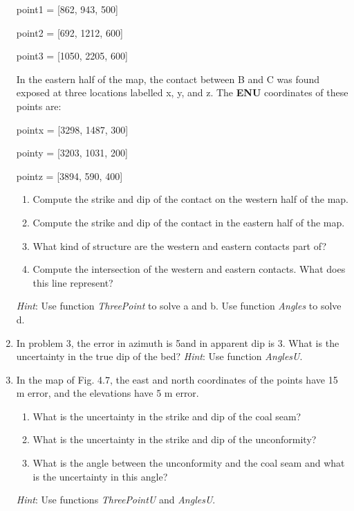 \documentclass[a4paper , 12pt]{book}
\begin{document}
\begin{enumerate}
    point1 = [862, 943, 500]
    
    point2 = [692, 1212, 600]
    
    point3 = [1050, 2205, 600]
    
    In the eastern half of the map, the contact between B and C was found exposed at three locations labelled x, y, and z. The \textbf{ENU} coordinates of these points are:
    
    pointx = [3298, 1487, 300]
    
    pointy = [3203, 1031, 200]
    
    pointz = [3894, 590, 400]
    
    \begin{enumerate}
        \item Compute the strike and dip of the contact on the western half of the map.
        \item Compute the strike and dip of the contact in the eastern half of the map.
        \item What kind of structure are the western and eastern contacts part of? 
        \item Compute the intersection of the western and eastern contacts. What does this line represent?
    \end{enumerate}
    
     \textit{Hint}: Use function \textit{ThreePoint} to solve a and b. Use function \textit{Angles} to solve d.
     
     \item In problem 3, the error in azimuth is 5\degree and in apparent dip is 3\degree. What is the uncertainty in the true dip of the bed? \textit{Hint}: Use function \textit{AnglesU}.
     
     \item In the map of Fig. 4.7, the east and north coordinates of the points have 15 m error, and the elevations have 5 m error. 
     \begin{enumerate}
        \item What is the uncertainty in the strike and dip of the coal seam?
        \item What is the uncertainty in the strike and dip of the unconformity?
        \item What is the angle between the unconformity and the coal seam and what is the uncertainty in this angle?
    \end{enumerate}
    \textit{Hint}: Use functions \textit{ThreePointU} and \textit{AnglesU}.

\end{enumerate}
\end{document}
